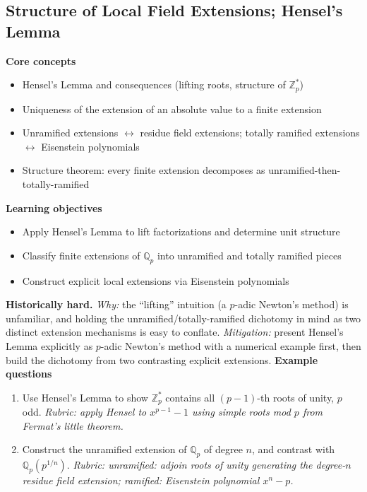 \documentclass[11pt]{article}
\newcommand{\Qp}{\mathbb{Q}_p}
\newcommand{\Zp}{\mathbb{Z}_p}
\begin{document}
\subsection{Structure of Local Field Extensions; Hensel's Lemma}
\textbf{Core concepts}
\begin{itemize}[noitemsep]
  \item Hensel's Lemma and consequences (lifting roots, structure of $\Zp^*$)
  \item Uniqueness of the extension of an absolute value to a finite extension
  \item Unramified extensions $\leftrightarrow$ residue field extensions; totally ramified extensions $\leftrightarrow$ Eisenstein polynomials
  \item Structure theorem: every finite extension decomposes as unramified-then-totally-ramified
\end{itemize}
\textbf{Learning objectives}
\begin{itemize}[noitemsep]
  \item Apply Hensel's Lemma to lift factorizations and determine unit structure
  \item Classify finite extensions of $\Qp$ into unramified and totally ramified pieces
  \item Construct explicit local extensions via Eisenstein polynomials
\end{itemize}
\textbf{Historically hard.} \emph{Why:} the ``lifting'' intuition (a $p$-adic Newton's method) is unfamiliar, and holding the unramified/totally-ramified dichotomy in mind as two distinct extension mechanisms is easy to conflate. \emph{Mitigation:} present Hensel's Lemma explicitly as $p$-adic Newton's method with a numerical example first, then build the dichotomy from two contrasting explicit extensions.
\textbf{Example questions}
\begin{enumerate}[noitemsep]
  \item[Q1 (foundational).] Use Hensel's Lemma to show $\Zp^*$ contains all $(p{-}1)$-th roots of unity, $p$ odd. \emph{Rubric: apply Hensel to $x^{p-1}-1$ using simple roots mod $p$ from Fermat's little theorem.}
  \item[Q2 (advanced).] Construct the unramified extension of $\Qp$ of degree $n$, and contrast with $\Qp(p^{1/n})$. \emph{Rubric: unramified: adjoin roots of unity generating the degree-$n$ residue field extension; ramified: Eisenstein polynomial $x^n-p$.}
\end{enumerate}

\end{document}
